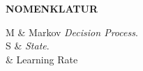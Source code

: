 \begin{center}
\Large\textbf{NOMENKLATUR}
\end{center}
\vspace{1ex}
\begin{conditions}
		M &	Markov \textit{Decision Process}.\\
		S &	\textit{State}.\\
		\alpha& Learning Rate
\end{conditions}
\newpage
